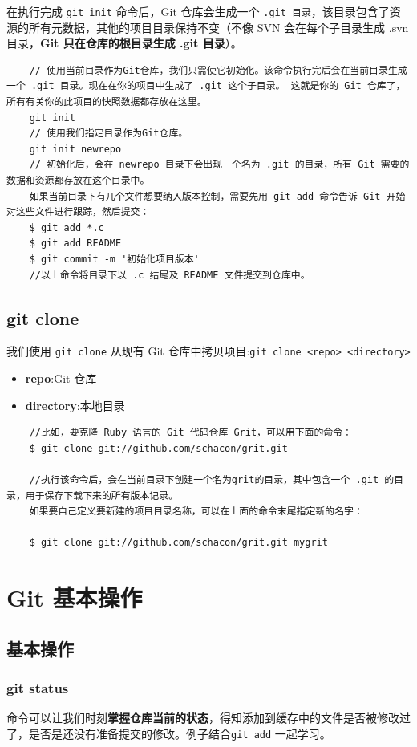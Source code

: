 \documentclass[UTF8,a4paper,12pt]{ctexbook}
\begin{document}
		  在执行完成 \verb|git init| 命令后，Git 仓库会生成一个 \verb|.git 目录|，该目录包含了资源的所有元数据，其他的项目目录保持不变（不像 SVN 会在每个子目录生成 .svn 目录，\textbf{Git 只在仓库的根目录生成 .git 目录}）。
		  \begin{lstlisting}
	// 使用当前目录作为Git仓库，我们只需使它初始化。该命令执行完后会在当前目录生成一个 .git 目录。现在在你的项目中生成了 .git 这个子目录。 这就是你的 Git 仓库了，所有有关你的此项目的快照数据都存放在这里。
	git init
	// 使用我们指定目录作为Git仓库。 
	git init newrepo
	// 初始化后，会在 newrepo 目录下会出现一个名为 .git 的目录，所有 Git 需要的数据和资源都存放在这个目录中。
	如果当前目录下有几个文件想要纳入版本控制，需要先用 git add 命令告诉 Git 开始对这些文件进行跟踪，然后提交： 
	$ git add *.c
	$ git add README
	$ git commit -m '初始化项目版本'
	//以上命令将目录下以 .c 结尾及 README 文件提交到仓库中。
		  \end{lstlisting}
		
	\section{git clone}
		我们使用 \verb|git clone| 从现有 Git 仓库中拷贝项目:\verb|git clone <repo> <directory>|
			\begin{itemize}[itemindent = 1em]
				\item \textbf{repo}:Git 仓库
				\item \textbf{directory}:本地目录
			\end{itemize}
		 
		 \begin{lstlisting}
	//比如，要克隆 Ruby 语言的 Git 代码仓库 Grit，可以用下面的命令： 
	$ git clone git://github.com/schacon/grit.git
	
	//执行该命令后，会在当前目录下创建一个名为grit的目录，其中包含一个 .git 的目录，用于保存下载下来的所有版本记录。 
	如果要自己定义要新建的项目目录名称，可以在上面的命令末尾指定新的名字：
	
	$ git clone git://github.com/schacon/grit.git mygrit
		 \end{lstlisting} 
  \chapter{Git 基本操作}
	  \section{基本操作}
		  \subsection{git status}
			  命令可以让我们时刻\textbf{掌握仓库当前的状态}，得知添加到缓存中的文件是否被修改过了，是否是还没有准备提交的修改。例子结合\verb|git add| 一起学习。
			  
\end{document}
